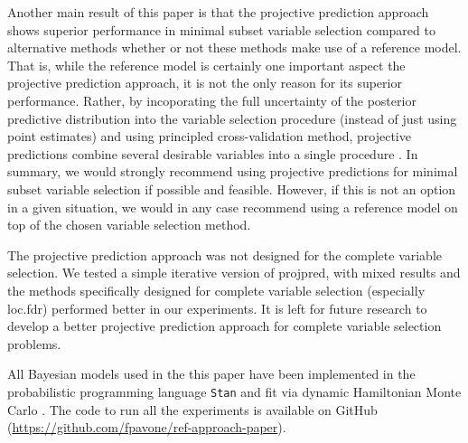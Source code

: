 \documentclass[a4]{article}
\theoremstyle{definition}
\begin{document}
Another main result of this paper is that the projective prediction
approach shows superior performance in minimal subset variable
selection compared to alternative methods whether or not these methods
make use of a reference model. That is, while the reference model is
certainly one important aspect the projective prediction approach, it
is not the only reason for its superior performance.  Rather, by
incoporating the full uncertainty of the posterior predictive
distribution into the variable selection procedure (instead of just
using point estimates) and using principled cross-validation method,
projective predictions combine several desirable variables into a
single procedure \citep{paper:projpred}.  In summary, we would
strongly recommend using projective predictions for minimal subset
 variable selection if possible and feasible. 
 However, if this is not an option in a given
situation, we would in any case recommend using a reference model on
top of the chosen variable selection method.

The projective prediction approach was not designed for the complete
variable selection. We tested a simple iterative version of projpred,
with mixed results and the methods specifically designed for complete
variable selection (especially loc.fdr) performed better in our
experiments. It is left for future research to develop 
a better projective prediction approach for complete variable
selection problems.

All Bayesian models used in the this paper have been implemented in
the probabilistic programming language \texttt{Stan}
\citep{paper:stan} and fit via dynamic Hamiltonian Monte Carlo
\citep{hoffman2014no,betancourt2017conceptual}. The code to run all
the experiments is available on GitHub
(\url{https://github.com/fpavone/ref-approach-paper}).

 


\appendix

\end{document}
